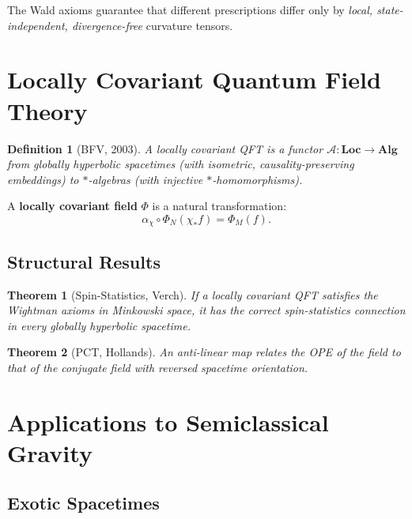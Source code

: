 \documentclass[11pt,a4paper]{article}
\newtheorem{definition}{Definition}[section]
\newtheorem{theorem}{Theorem}[section]
\begin{document}
The Wald axioms guarantee that different prescriptions differ only by
\emph{local, state-independent, divergence-free} curvature tensors.

\section{Locally Covariant Quantum Field Theory}

\begin{definition}[BFV, 2003]
A locally covariant QFT is a functor $\mathscr{A}: \mathbf{Loc} \to \mathbf{Alg}$
from globally hyperbolic spacetimes (with isometric, causality-preserving
embeddings) to $*$-algebras (with injective $*$-homomorphisms).
\end{definition}

A \textbf{locally covariant field} $\Phi$ is a natural transformation:
\begin{equation}
  \alpha_\chi \circ \Phi_N(\chi_* f) = \Phi_M(f).
\end{equation}

\subsection{Structural Results}

\begin{theorem}[Spin-Statistics, Verch]
If a locally covariant QFT satisfies the Wightman axioms in Minkowski space,
it has the correct spin-statistics connection in every globally hyperbolic spacetime.
\end{theorem}

\begin{theorem}[PCT, Hollands]
An anti-linear map relates the OPE of the field to that of the conjugate field
with reversed spacetime orientation.
\end{theorem}

\section{Applications to Semiclassical Gravity}

\subsection{Exotic Spacetimes}
\end{document}
